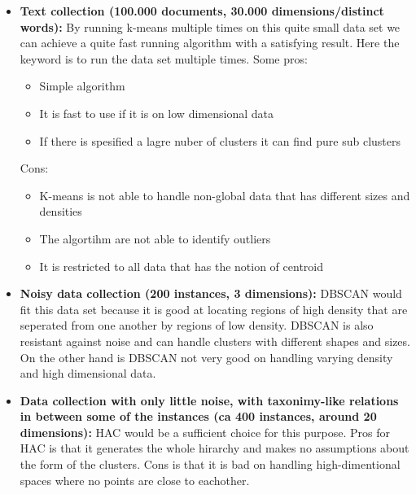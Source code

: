 		\begin{itemize}
			\item {\bf Text collection (100.000 documents, 30.000 dimensions/distinct words):}
			By running k-means multiple times on this quite small data set we can achieve a quite fast
			running algorithm with a satisfying result. 
			Here the keyword is to run the data set multiple times. Some pros:\\
			
			\begin{itemize}
			\item Simple algorithm
			\item It is fast to use if it is on low dimensional data
			\item If there is spesified a lagre nuber of clusters it can find pure sub clusters
			\end{itemize}

			Cons:\\
			\begin{itemize}
			\item K-means is not able to handle non-global data that has different sizes and densities
			\item The algortihm are not able to identify outliers
			\item It is restricted to all data that has the notion of centroid
			\end{itemize}
			
			\item {\bf Noisy data collection (200 instances, 3 dimensions):}
			DBSCAN would fit this data set because it is good at locating regions of high density that
			are seperated from one another by regions of low density. DBSCAN is also resistant against
			noise and can handle clusters with different shapes and sizes. On the other hand is DBSCAN not very good on 
			handling varying density and high dimensional data. 
			
			\item {\bf Data collection with only little noise, with taxonimy-like relations in 
			between some of the instances (ca 400 instances, around 20 dimensions):}
				HAC would be a sufficient choice for this purpose. 
			Pros for HAC is that it generates the whole hirarchy and makes no assumptions about the form of the clusters. Cons
			is that it is bad on handling high-dimentional spaces where no points are close to eachother.

		\end{itemize}
		
